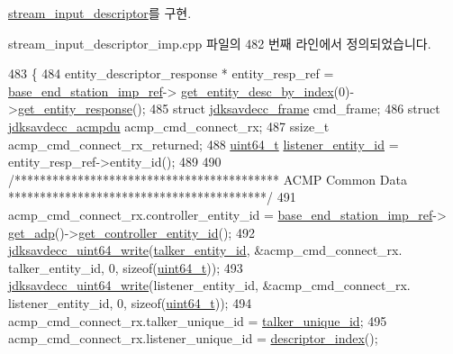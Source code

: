 \hyperlink{classavdecc__lib_1_1stream__input__descriptor_ac2512dd4aa0d7f0d917b61352294460f}{stream\+\_\+input\+\_\+descriptor}를 구현.



stream\+\_\+input\+\_\+descriptor\+\_\+imp.\+cpp 파일의 482 번째 라인에서 정의되었습니다.


\begin{DoxyCode}
483 \{
484     entity\_descriptor\_response * entity\_resp\_ref = \hyperlink{classavdecc__lib_1_1descriptor__base__imp_a550c969411f5f3b69f55cc139763d224}{base\_end\_station\_imp\_ref}->
      \hyperlink{classavdecc__lib_1_1end__station__imp_a2039add3a7eb753152149e07a86ad008}{get\_entity\_desc\_by\_index}(0)->\hyperlink{classavdecc__lib_1_1entity__descriptor_ac31dd117f0c931ae93c8ba52df7211bd}{get\_entity\_response}();
485     \textcolor{keyword}{struct }\hyperlink{structjdksavdecc__frame}{jdksavdecc\_frame} cmd\_frame;
486     \textcolor{keyword}{struct }\hyperlink{structjdksavdecc__acmpdu}{jdksavdecc\_acmpdu} acmp\_cmd\_connect\_rx;
487     ssize\_t acmp\_cmd\_connect\_rx\_returned;
488     \hyperlink{parse_8c_aec6fcb673ff035718c238c8c9d544c47}{uint64\_t} \hyperlink{structjdksavdecc__acmpdu_ae204d36de673d5135ef97cc19a344b37}{listener\_entity\_id} = entity\_resp\_ref->entity\_id();
489 
490     \textcolor{comment}{/****************************************** ACMP Common Data *****************************************/}
491     acmp\_cmd\_connect\_rx.controller\_entity\_id = \hyperlink{classavdecc__lib_1_1descriptor__base__imp_a550c969411f5f3b69f55cc139763d224}{base\_end\_station\_imp\_ref}->
      \hyperlink{classavdecc__lib_1_1end__station__imp_a471a74540ce6182fad0c17dfd010107e}{get\_adp}()->\hyperlink{classavdecc__lib_1_1adp_a0c0959a46658c0a22e9530334b2912da}{get\_controller\_entity\_id}();
492     \hyperlink{group__endian_gaa294fd85c2d887032dad294c6833c903}{jdksavdecc\_uint64\_write}(\hyperlink{structjdksavdecc__acmpdu_a5a263561481c86cc310ff078f7313b6d}{talker\_entity\_id}, &acmp\_cmd\_connect\_rx.
      talker\_entity\_id, 0, \textcolor{keyword}{sizeof}(\hyperlink{parse_8c_aec6fcb673ff035718c238c8c9d544c47}{uint64\_t}));
493     \hyperlink{group__endian_gaa294fd85c2d887032dad294c6833c903}{jdksavdecc\_uint64\_write}(listener\_entity\_id, &acmp\_cmd\_connect\_rx.
      listener\_entity\_id, 0, \textcolor{keyword}{sizeof}(\hyperlink{parse_8c_aec6fcb673ff035718c238c8c9d544c47}{uint64\_t}));
494     acmp\_cmd\_connect\_rx.talker\_unique\_id = \hyperlink{structjdksavdecc__acmpdu_a0358bf4a1f59922974d1f0cb08fd8ef4}{talker\_unique\_id};
495     acmp\_cmd\_connect\_rx.listener\_unique\_id = \hyperlink{classavdecc__lib_1_1descriptor__base__imp_ac23c0a35276c07cfce8c8660700c2135}{descriptor\_index}();

\end{DoxyCode}

